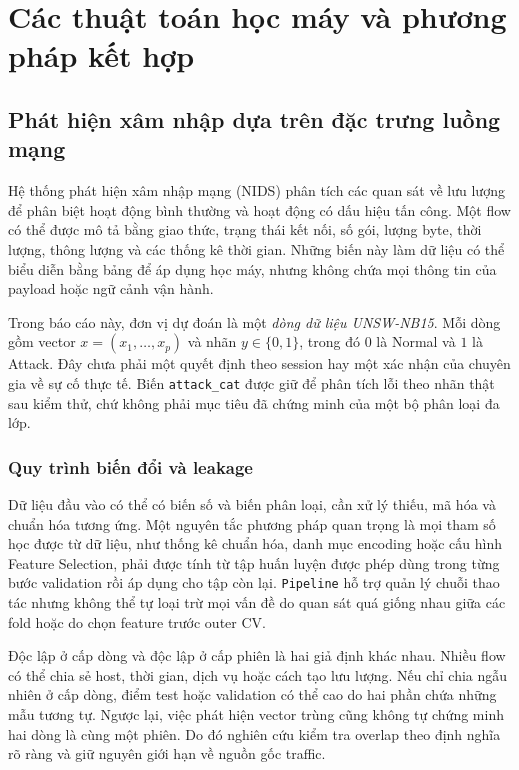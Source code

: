 \section{Các thuật toán học máy và phương pháp kết hợp}


\subsection{Phát hiện xâm nhập dựa trên đặc trưng luồng mạng}
Hệ thống phát hiện xâm nhập mạng (NIDS) phân tích các quan sát về lưu lượng để phân biệt hoạt động bình thường và hoạt động có dấu hiệu tấn công. Một flow có thể được mô tả bằng giao thức, trạng thái kết nối, số gói, lượng byte, thời lượng, thông lượng và các thống kê thời gian. Những biến này làm dữ liệu có thể biểu diễn bằng bảng để áp dụng học máy, nhưng không chứa mọi thông tin của payload hoặc ngữ cảnh vận hành.

Trong báo cáo này, đơn vị dự đoán là một \emph{dòng dữ liệu UNSW-NB15}. Mỗi dòng gồm vector $x=(x_1,\ldots,x_p)$ và nhãn $y\in\{0,1\}$, trong đó $0$ là Normal và $1$ là Attack. Đây chưa phải một quyết định theo session hay một xác nhận của chuyên gia về sự cố thực tế. Biến \texttt{attack\_cat} được giữ để phân tích lỗi theo nhãn thật sau kiểm thử, chứ không phải mục tiêu đã chứng minh của một bộ phân loại đa lớp.

\subsubsection{Quy trình biến đổi và leakage}
Dữ liệu đầu vào có thể có biến số và biến phân loại, cần xử lý thiếu, mã hóa và chuẩn hóa tương ứng. Một nguyên tắc phương pháp quan trọng là mọi tham số học được từ dữ liệu, như thống kê chuẩn hóa, danh mục encoding hoặc cấu hình Feature Selection, phải được tính từ tập huấn luyện được phép dùng trong từng bước validation rồi áp dụng cho tập còn lại. \texttt{Pipeline} hỗ trợ quản lý chuỗi thao tác nhưng không thể tự loại trừ mọi vấn đề do quan sát quá giống nhau giữa các fold hoặc do chọn feature trước outer CV.

Độc lập ở cấp dòng và độc lập ở cấp phiên là hai giả định khác nhau. Nhiều flow có thể chia sẻ host, thời gian, dịch vụ hoặc cách tạo lưu lượng. Nếu chỉ chia ngẫu nhiên ở cấp dòng, điểm test hoặc validation có thể cao do hai phần chứa những mẫu tương tự. Ngược lại, việc phát hiện vector trùng cũng không tự chứng minh hai dòng là cùng một phiên. Do đó nghiên cứu kiểm tra overlap theo định nghĩa rõ ràng và giữ nguyên giới hạn về nguồn gốc traffic.

